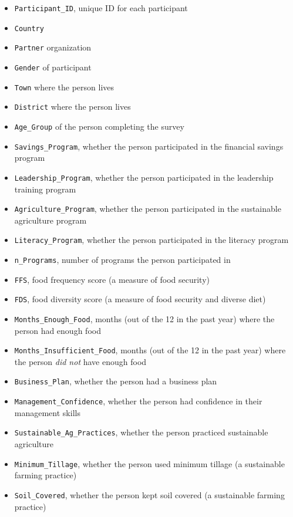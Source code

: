 \documentclass[
  letterpaper,
  DIV=11,
  numbers=noendperiod]{scrartcl}
\begin{document}
\begin{itemize}
\item
  \texttt{Participant\_ID}, unique ID for each participant
\item
  \texttt{Country}
\item
  \texttt{Partner} organization
\item
  \texttt{Gender} of participant
\item
  \texttt{Town} where the person lives
\item
  \texttt{District} where the person lives
\item
  \texttt{Age\_Group} of the person completing the survey
\item
  \texttt{Savings\_Program}, whether the person participated in the
  financial savings program
\item
  \texttt{Leadership\_Program}, whether the person participated in the
  leadership training program
\item
  \texttt{Agriculture\_Program}, whether the person participated in the
  sustainable agriculture program
\item
  \texttt{Literacy\_Program}, whether the person participated in the
  literacy program
\item
  \texttt{n\_Programs}, number of programs the person participated in
\item
  \texttt{FFS}, food frequency score (a measure of food security)
\item
  \texttt{FDS}, food diversity score (a measure of food security and
  diverse diet)
\item
  \texttt{Months\_Enough\_Food}, months (out of the 12 in the past year)
  where the person had enough food
\item
  \texttt{Months\_Insufficient\_Food}, months (out of the 12 in the past
  year) where the person \emph{did not} have enough food
\item
  \texttt{Business\_Plan}, whether the person had a business plan
\item
  \texttt{Management\_Confidence}, whether the person had confidence in
  their management skills
\item
  \texttt{Sustainable\_Ag\_Practices}, whether the person practiced
  sustainable agriculture
\item
  \texttt{Minimum\_Tillage}, whether the person used minimum tillage (a
  sustainable farming practice)
\item
  \texttt{Soil\_Covered}, whether the person kept soil covered (a
  sustainable farming practice)

\end{itemize}
\end{document}
